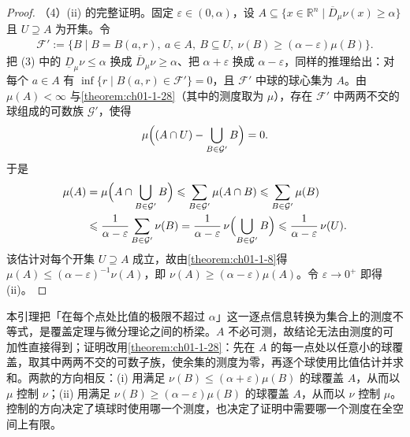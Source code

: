 \documentclass[../../main.tex]{subfiles}%
\begin{document}
\begin{proof}
（4）(ii) 的完整证明。固定 $\varepsilon\in(0,\alpha)$，设 $A\subseteq\{x\in\mathbb{R}^n\mid\overline{D}_{\mu}\nu(x)\geqslant\alpha\}$ 且 $U\supseteq A$ 为开集。令
\begin{align*}
\mathcal{F}':=\{B\mid B=B(a,r),\ a\in A,\ B\subseteq U,\ \nu(B)\geqslant(\alpha-\varepsilon)\mu(B)\}.
\end{align*}
把 (3) 中的 $\underline{D}_{\mu}\nu\leqslant\alpha$ 换成 $\overline{D}_{\mu}\nu\geqslant\alpha$、把 $\alpha+\varepsilon$ 换成 $\alpha-\varepsilon$，同样的推理给出：对每个 $a\in A$ 有 $\inf\{r\mid B(a,r)\in\mathcal{F}'\}=0$，且 $\mathcal{F}'$ 中球的球心集为 $A$。由 $\mu(A)<\infty$ 与\cref{theorem:ch01-1-28}（其中的测度取为 $\mu$），存在 $\mathcal{F}'$ 中两两不交的球组成的可数族 $\mathcal{G}'$，使得%
\begin{align*}
\mu\Bigl((A\cap U)-\bigcup_{B\in\mathcal{G}'}B\Bigr)=0.
\end{align*}
于是
\begin{align*}
\mu(A)
&=\mu\Bigl(A\cap\bigcup_{B\in\mathcal{G}'}B\Bigr)
\leqslant\sum_{B\in\mathcal{G}'}\mu(A\cap B)
\leqslant\sum_{B\in\mathcal{G}'}\mu(B)\\
&\leqslant\frac{1}{\alpha-\varepsilon}\sum_{B\in\mathcal{G}'}\nu(B)
=\frac{1}{\alpha-\varepsilon}\,\nu\Bigl(\bigcup_{B\in\mathcal{G}'}B\Bigr)
\leqslant\frac{1}{\alpha-\varepsilon}\,\nu(U).
\end{align*}
该估计对每个开集 $U\supseteq A$ 成立，故由\cref{theorem:ch01-1-8}得 $\mu(A)\leqslant(\alpha-\varepsilon)^{-1}\nu(A)$，即 $\nu(A)\geqslant(\alpha-\varepsilon)\mu(A)$。令 $\varepsilon\to0^{+}$ 即得 (ii)。%
\end{proof}

\begin{remark}\label{remark:ch01-lem-1-2-动机}
本引理把「在每个点处比值的极限不超过 $\alpha$」这一逐点信息转换为集合上的测度不等式，是覆盖定理与微分理论之间的桥梁。$A$ 不必可测，故结论无法由测度的可加性直接得到；证明改用\cref{theorem:ch01-1-28}：先在 $A$ 的每一点处以任意小的球覆盖，取其中两两不交的可数子族，使余集的测度为零，再逐个球使用比值估计并求和。两款的方向相反：(i) 用满足 $\nu(B)\leqslant(\alpha+\varepsilon)\mu(B)$ 的球覆盖 $A$，从而以 $\mu$ 控制 $\nu$；(ii) 用满足 $\nu(B)\geqslant(\alpha-\varepsilon)\mu(B)$ 的球覆盖 $A$，从而以 $\nu$ 控制 $\mu$。控制的方向决定了填球时使用哪一个测度，也决定了证明中需要哪一个测度在全空间上有限。 %
\end{remark}
\end{document}
